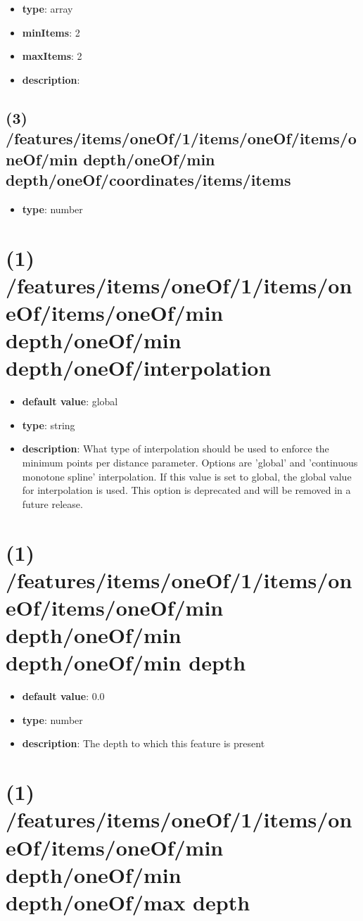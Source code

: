 \begin{itemize}[leftmargin=2em]\item {\bf type}: array
\item {\bf minItems}: 2
\item {\bf maxItems}: 2
\item {\bf description}: 
\end{itemize}\subsection{(3) /features/items/oneOf/1/items/oneOf/items/oneOf/min depth/oneOf/min depth/oneOf/coordinates/items/items}
\begin{itemize}[leftmargin=3em]\item {\bf type}: number
\end{itemize}\section{(1) /features/items/oneOf/1/items/oneOf/items/oneOf/min depth/oneOf/min depth/oneOf/interpolation}
\begin{itemize}[leftmargin=1em]\item {\bf default value}: global
\item {\bf type}: string
\item {\bf description}: What type of interpolation should be used to enforce the minimum points per distance parameter. Options are 'global' and 'continuous monotone spline' interpolation. If this value is set to global, the global value for interpolation is used. This option is deprecated and will be removed in a future release.
\end{itemize}\section{(1) /features/items/oneOf/1/items/oneOf/items/oneOf/min depth/oneOf/min depth/oneOf/min depth}
\begin{itemize}[leftmargin=1em]\item {\bf default value}: 0.0
\item {\bf type}: number
\item {\bf description}: The depth to which this feature is present
\end{itemize}\section{(1) /features/items/oneOf/1/items/oneOf/items/oneOf/min depth/oneOf/min depth/oneOf/max depth}
